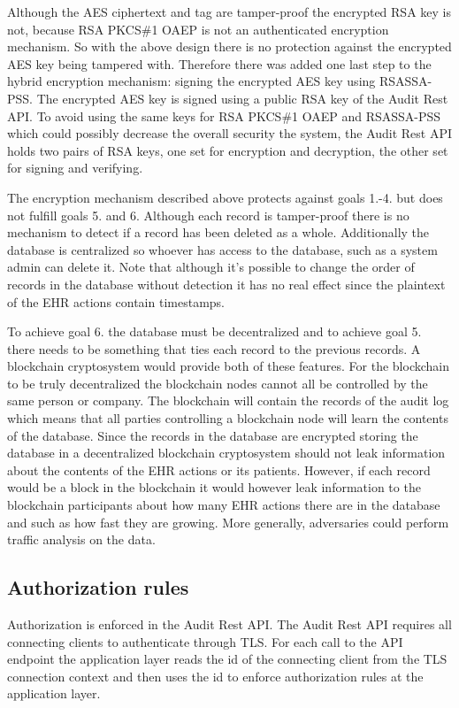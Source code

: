 \documentclass[11pt]{article}
\begin{document}
\begin{flushleft}
Although the AES ciphertext and tag are tamper-proof the encrypted RSA key is not, because RSA PKCS\#1 OAEP is not an authenticated encryption mechanism. So with the above design there is no protection against the encrypted AES key being tampered with. Therefore there was added one last step to the hybrid encryption mechanism: signing the encrypted AES key using RSASSA-PSS. The encrypted AES key is signed using a public RSA key of the Audit Rest API. To avoid using the same keys for RSA PKCS\#1 OAEP and RSASSA-PSS which could possibly decrease the overall security the system, the Audit Rest API holds two pairs of RSA keys, one set for encryption and decryption, the other set for signing and verifying.

The encryption mechanism described above protects against goals 1.-4. but does not fulfill goals 5. and 6. Although each record is tamper-proof there is no mechanism to detect if a record has been deleted as a whole. Additionally the database is centralized so whoever has access to the database, such as a system admin can delete it. Note that although it's possible to change the order of records in the database without detection it has no real effect since the plaintext of the EHR actions contain timestamps.

To achieve goal 6. the database must be decentralized and to achieve goal 5. there needs to be something that ties each record to the previous records. A blockchain cryptosystem would provide both of these features. For the blockchain to be truly decentralized the blockchain nodes cannot all be controlled by the same person or company. The blockchain will contain the records of the audit log which means that all parties controlling a blockchain node will learn the contents of the database. Since the records in the database are encrypted storing the database in a decentralized blockchain cryptosystem should not leak information about the contents of the EHR actions or its patients. However, if each record would be a block in the blockchain it would however leak information to the blockchain participants about how many EHR actions there are in the database and such as how fast they are growing. More generally, adversaries could perform traffic analysis on the data.

\subsection{Authorization rules}

Authorization is enforced in the Audit Rest API. The Audit Rest API requires all connecting clients to authenticate through TLS. For each call to the API endpoint the application layer reads the id of the connecting client from the TLS connection context and then uses the id to enforce authorization rules at the application layer.


\end{flushleft}
\end{document}
